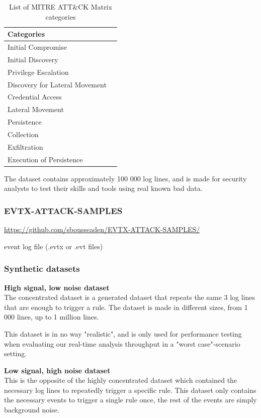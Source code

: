 \begin{table}[htbp]
\begin{tabular}{l|l}
Categories \\ \hline
Initial Compromise \\
Initial Discovery \\
Privilege Escalation \\
Discovery for Lateral Movement \\
Credential Access \\
Lateral Movement \\
Persistence \\
Collection \\
Exfiltration \\
Execution of Persistence
\end{tabular}
\caption{List of MITRE ATT\&CK Matrix categories}
\label{tab:mitre-attack-categories}
\end{table}


The dataset contains approximately 100 000 log lines, and is made for security analysts to test their skills and tools using real known bad data.

\subsubsection{EVTX-ATTACK-SAMPLES}
\url{https://github.com/sbousseaden/EVTX-ATTACK-SAMPLES/}

event log file (.evtx or .evt files) \textcite{windows_events_docs}

\subsubsection{Synthetic datasets}

\textbf{High signal, low noise dataset}\\
The concentrated dataset is a generated dataset that repeats the same 3 log lines that are enough to trigger a rule. The dataset is made in different sizes, from 1 000 lines, up to 1 million lines.

This dataset is in no way "realistic", and is only used for performance testing when evaluating our real-time analysis throughput in a "worst case"-scenario setting.

\textbf{Low signal, high noise dataset}\\
This is the opposite of the highly concentrated dataset which contained the necessary log lines to repeatedly trigger a specific rule. This dataset only contains the necessary events to trigger a single rule once, the rest of the events are simply background noise.

